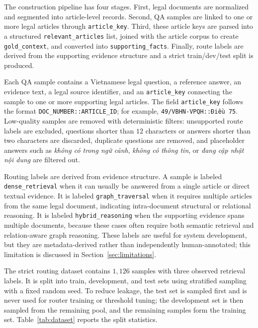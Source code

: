 \documentclass[11pt,twocolumn]{article}
\begin{document}
The construction pipeline has four stages. First, legal
documents are normalized and segmented into article-level
records. Second, QA samples are linked to one or more legal
articles through \texttt{article\_key}. Third, these article
keys are parsed into a structured \texttt{relevant\_articles}
list, joined with the article corpus to create
\texttt{gold\_context}, and converted into
\texttt{supporting\_facts}. Finally, route labels are derived
from the supporting evidence structure and a strict
train/dev/test split is produced.

Each QA sample contains a Vietnamese legal question, a
reference answer, an evidence text, a legal source identifier,
and an \texttt{article\_key} connecting the sample to one or
more supporting legal articles. The field
\texttt{article\_key} follows the format
\texttt{DOC\_NUMBER::ARTICLE\_ID}; for example,
\texttt{49/VBHN-VPQH::Điều 75}. Low-quality samples are
removed with deterministic filters: unsupported route labels
are excluded, questions shorter than $12$ characters or
answers shorter than two characters are discarded, duplicate
questions are removed, and placeholder answers such as
\textit{không có trong ngữ cảnh}, \textit{không có thông tin},
or \textit{đang cập nhật nội dung} are filtered out.

Routing labels are derived from evidence structure. A sample
is labeled \texttt{dense\_retrieval} when it can usually be
answered from a single article or direct textual evidence. It
is labeled \texttt{graph\_traversal} when it requires
multiple articles from the same legal document, indicating
intra-document structural or relational reasoning. It is
labeled \texttt{hybrid\_reasoning} when the supporting
evidence spans multiple documents, because these cases often
require both semantic retrieval and relation-aware graph
reasoning. These labels are useful for system development,
but they are metadata-derived rather than independently
human-annotated; this limitation is discussed in
Section~\ref{sec:limitations}.

The strict routing dataset contains $1{,}126$ samples with
three observed retrieval labels. It is split into train,
development, and test sets using stratified sampling with a
fixed random seed. To reduce leakage, the test set is sampled
first and is never used for router training or threshold
tuning; the development set is then sampled from the
remaining pool, and the remaining samples form the training
set.
Table~\ref{tab:dataset} reports the split statistics.
\end{document}

